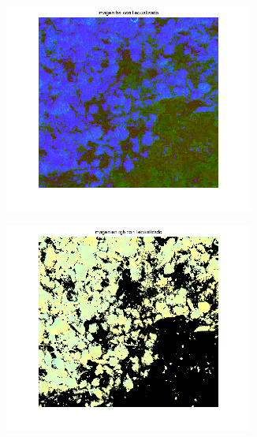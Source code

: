 \documentclass{article}
\begin{document}
\begin{figure}[H]
\begin{subfigure}{0.5\textwidth}
    \end{subfigure}\hfill
	\begin{subfigure}{0.5\textwidth}
	\centering
        \includegraphics[width=0.9\textwidth]{1892xxx-hsi-i-ecualizado.png}
    \end{subfigure}\hfill
	\begin{subfigure}{0.5\textwidth}
	\centering
        \includegraphics[width=0.9\textwidth]{1892xxx-rgb-i-ecualizado.png}
    \end{subfigure}\hfill
\end{figure}
\end{document}
